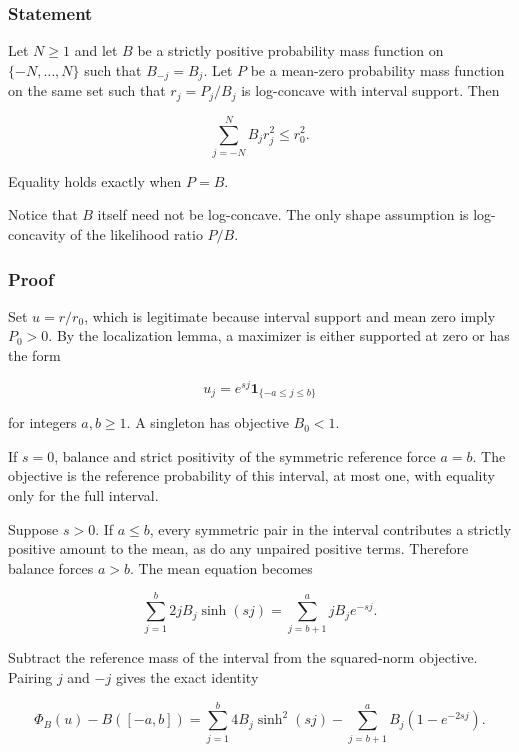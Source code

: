 \documentclass[11pt,a4paper]{article}
\theoremstyle{definition}
\theoremstyle{remark}
\begin{document}
\subsubsection{Statement}\label{scalar-statement}

Let \(N\ge1\) and let \(B\) be a strictly positive probability mass
function on \(\{-N,\ldots,N\}\) such that \(B_{-j}=B_j\). Let \(P\) be a
mean-zero probability mass function on the same set such that
\(r_j=P_j/B_j\) is log-concave with interval support. Then

\begin{equation}\label{eq:s-7}
\boxed{\quad\sum_{j=-N}^N B_jr_j^2\le r_0^2.\quad}
\end{equation}

Equality holds exactly when \(P=B\).

Notice that \(B\) itself need not be log-concave. The only shape
assumption is log-concavity of the likelihood ratio \(P/B\).

\subsubsection{Proof}\label{scalar-proof}

Set \(u=r/r_0\), which is legitimate because interval support and mean
zero imply \(P_0>0\). By the localization lemma, a maximizer is either
supported at zero or has the form

\[
u_j=e^{sj}\mathbf1_{\{-a\le j\le b\}}
\]

for integers \(a,b\ge1\). A singleton has objective \(B_0<1\).

If \(s=0\), balance and strict positivity of the symmetric reference
force \(a=b\). The objective is the reference probability of this
interval, at most one, with equality only for the full interval.

Suppose \(s>0\). If \(a\le b\), every symmetric pair in the interval
contributes a strictly positive amount to the mean, as do any unpaired
positive terms. Therefore balance forces \(a>b\). The mean equation
becomes

\begin{equation}\label{eq:s-8}
\sum_{j=1}^b 2jB_j\sinh(sj)
=\sum_{j=b+1}^a jB_j e^{-sj}.
\end{equation}

Subtract the reference mass of the interval from the squared-norm
objective. Pairing \(j\) and \(-j\) gives the exact identity

\begin{equation}\label{eq:s-9}
\Phi_B(u)-B([-a,b])
=\sum_{j=1}^b4B_j\sinh^2(sj)
-\sum_{j=b+1}^aB_j(1-e^{-2sj}).
\end{equation}
\end{document}

